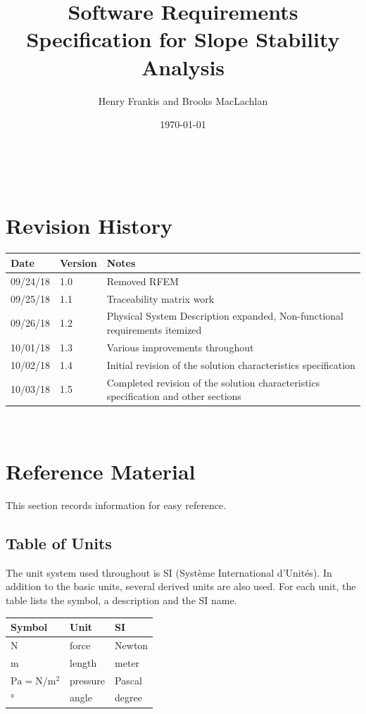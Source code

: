 \documentclass[12pt]{article}
\renewcommand{\arraystretch}{1}
\begin{document}
\title{Software Requirements Specification for Slope Stability Analysis}
\author{Henry Frankis and Brooks MacLachlan}
\date{\today}
	
\maketitle

~\newpage


\section{Revision History}

\begin{tabularx}{\textwidth}{p{3cm}p{2cm}X}
	\toprule {\bf Date} & {\bf Version} & {\bf Notes}\\
	\midrule
	09/24/18 & 1.0 & Removed RFEM\\
	09/25/18 & 1.1 & Traceability matrix work\\
	09/26/18 & 1.2 & Physical System Description expanded, Non-functional 
	requirements itemized\\
	10/01/18 & 1.3 & Various improvements throughout\\
	10/02/18 & 1.4 & Initial revision of the solution characteristics 
	specification\\
	10/03/18 & 1.5 & Completed revision of the solution characteristics 
	specification and other sections\\
	\bottomrule
\end{tabularx}

~\newpage

\section{Reference Material}
This section records information for easy reference.
\subsection{Table of Units}

The unit system used throughout is SI (Syst\`{e}me International d'Unit\'{e}s). 
In
 addition to the basic units, several derived units are also used. For each 
 unit, the table
 lists the symbol, a description and the SI name.
\newline

\renewcommand{\arraystretch}{1.2}
\setlength{\tabcolsep}{20pt}
\begin{tabular}{  l  l  l  }
\hline
\textbf{Symbol} & \textbf{Unit} & \textbf{SI} \\
\hline
\si{\newton} & force & Newton \\
\si{\meter} & length & meter \\
$\si{\pascal}=\si{\newton\per\square\meter}$ & pressure & Pascal \\
\si{\degree} & angle & degree  \\
\hline
\end{tabular}
\renewcommand{\arraystretch}{1}
\end{document}
